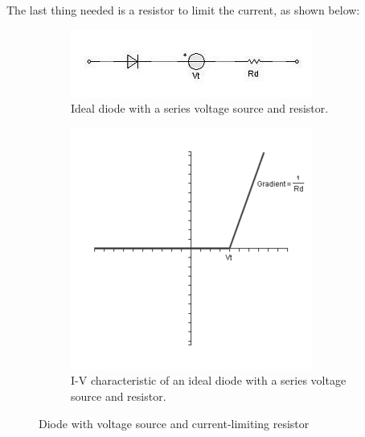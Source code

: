 The last thing needed is a resistor to limit the current, as shown below:

\begin{figure}[H]
  \centering
  \begin{subfigure}{.4\textwidth}
    \centering
    \includegraphics[width=\linewidth]{figures/Diode_Modelling_Image9}
    \caption{Ideal diode with a series voltage source and resistor.}
    \label{fig:}
  \end{subfigure}%
  \begin{subfigure}{.4\textwidth}
    \centering
    \includegraphics[width=\linewidth]{figures/Diode_Modelling_Image11}
    \caption{I-V characteristic of an ideal diode with a series voltage source and resistor.}
    \label{fig:}
  \end{subfigure}
  \caption{Diode with voltage source and current-limiting resistor}
  \label{fig:}
\end{figure}

